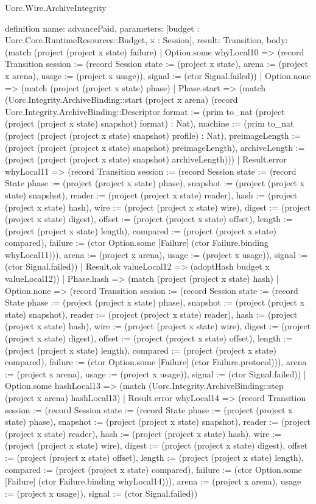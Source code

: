 \begin{lexlean}{Uorc.Wire.ArchiveIntegrity}
\begin{semanticmodule}
definition{
  name: advancePaid,
  parameters: [budget : Uorc.Core.RuntimeResources::Budget, x : Session],
  result: Transition,
  body: (match (project (project x state) failure)
    | Option.some whyLocal10 => (record Transition {session := (record Session {state := (project x state), arena := (project x arena), usage := (project x usage)}), signal := (ctor Signal.failed)})
    | Option.none => (match (project (project x state) phase)
      | Phase.start => (match (Uorc.Integrity.ArchiveBinding::start (project x arena) (record Uorc.Integrity.ArchiveBinding::Descriptor {format := (prim to_nat (project (project (project x state) snapshot) format) : Nat), machine := (prim to_nat (project (project (project x state) snapshot) profile) : Nat), preimageLength := (project (project (project x state) snapshot) preimageLength), archiveLength := (project (project (project x state) snapshot) archiveLength)}))
        | Result.error whyLocal11 => (record Transition {session := (record Session {state := (record State {phase := (project (project x state) phase), snapshot := (project (project x state) snapshot), reader := (project (project x state) reader), hash := (project (project x state) hash), wire := (project (project x state) wire), digest := (project (project x state) digest), offset := (project (project x state) offset), length := (project (project x state) length), compared := (project (project x state) compared), failure := (ctor Option.some [Failure] (ctor Failure.binding whyLocal11))}), arena := (project x arena), usage := (project x usage)}), signal := (ctor Signal.failed)})
        | Result.ok valueLocal12 => (adoptHash budget x valueLocal12))
      | Phase.hash => (match (project (project x state) hash)
        | Option.none => (record Transition {session := (record Session {state := (record State {phase := (project (project x state) phase), snapshot := (project (project x state) snapshot), reader := (project (project x state) reader), hash := (project (project x state) hash), wire := (project (project x state) wire), digest := (project (project x state) digest), offset := (project (project x state) offset), length := (project (project x state) length), compared := (project (project x state) compared), failure := (ctor Option.some [Failure] (ctor Failure.protocol))}), arena := (project x arena), usage := (project x usage)}), signal := (ctor Signal.failed)})
        | Option.some hashLocal13 => (match (Uorc.Integrity.ArchiveBinding::step (project x arena) hashLocal13)
          | Result.error whyLocal14 => (record Transition {session := (record Session {state := (record State {phase := (project (project x state) phase), snapshot := (project (project x state) snapshot), reader := (project (project x state) reader), hash := (project (project x state) hash), wire := (project (project x state) wire), digest := (project (project x state) digest), offset := (project (project x state) offset), length := (project (project x state) length), compared := (project (project x state) compared), failure := (ctor Option.some [Failure] (ctor Failure.binding whyLocal14))}), arena := (project x arena), usage := (project x usage)}), signal := (ctor Signal.failed)})
}
\end{semanticmodule}
\end{lexlean}
